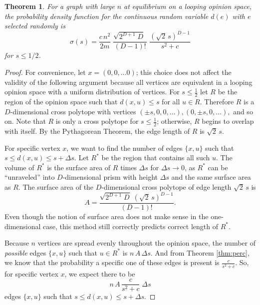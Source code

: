 \documentclass[a4paper,10pt]{article}
\newtheorem{theorem}{Theorem}
\begin{document}
\begin{theorem}
 For a graph with large $n$ at equilibrium on a looping opinion space, the probability density function for the continuous random variable $d(e)$ with $e$ selected randomly is
 \begin{equation}
 \sigma(s) = \frac{c\,n^2}{2m}\;\frac{\sqrt{2^{D+1}\;D} \;}{(D-1)!}\;\frac{(\sqrt{2}\,s)^{D-1}}{s^2 + c}
 \end{equation}
for $s \leq 1/2$.
\end{theorem}
\begin{proof}
For convenience, let $x = (0, 0, \ldots 0)$; this choice does not affect the validity of the following argument because all vertices are equivalent in a looping opinion space with a uniform distribution of vertices. For $s \leq \frac{1}{2}$ let $R$ be the region of the opinion space such that $d(x, u) \leq s$ for all $u \in R$. Therefore $R$ is a $D$-dimensional cross polytope with vertices $(\pm s, 0, 0, \ldots), (0, \pm s, 0, \ldots),$ and so on. Note that $R$ is only a cross polytope for $s \leq \frac{1}{2}$; otherwise, $R$ begins to overlap with itself. By the Pythagorean Theorem, the edge length of $R$ is $\sqrt{2}\,s$.

For specific vertex $x$, we want to find the number of edges $\{x, u\}$ such that $s \leq d(x, u) \leq s + \Delta s.$ Let $R^*$ be the region that contains all such $u$.  The volume of $R^*$ is the surface area of $R$ times $\Delta s$ for $\Delta s \to 0$, as $R^*$ can be ``unraveled'' into $D$-dimensional prism with height $\Delta s$ and the same surface area as $R$. The surface area of the $D$-dimensional cross polytope of edge length $\sqrt{2}\,s$ is
\begin{equation}
A = \frac{\sqrt{2^{D+1}\;D} \; (\sqrt{2}\,s)^{D-1}}{(D-1)!}.
\end{equation} 
Even though the notion of surface area does not make sense in the one-dimensional case, this method still correctly predicts correct length of $R^*$.

Because $n$ vertices are spread evenly throughout the opinion space, the number of \emph{possible} edges $\{x, u\}$ such that $u \in R^*$ is 
$n \, A \, \Delta s.$ And from Theorem \ref{thm:perc}, we know that the probability a specific one of these edges is present is $\frac{c}{s^2 + c}$. So, for specific vertex $x$, we expect there to be 
\begin{equation}
n\,A\,\frac{c}{s^2 + c} \; \Delta s 
\end{equation}
 edges $\{x, u\}$ such that $s \leq d(x, u) \leq s + \Delta s.$ 


\end{proof}
\end{document}
